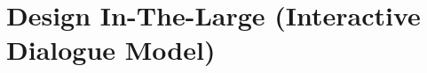\documentclass[../DD.tex]{subfiles}
\begin{document}
\chapter{Design In-The-Large (Interactive Dialogue Model)}
\thispagestyle{fancy}
	
	
\end{document}
